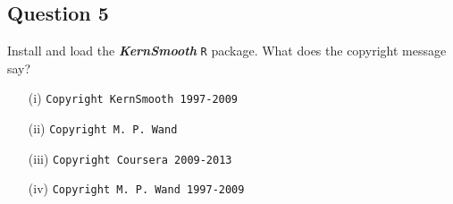 \documentclass[12pt]{article}
\begin{document}
\newpage

\subsection*{Question 5}
Install and load the \textbf{\emph{KernSmooth}} \texttt{R} package. What does the copyright message say?

\begin{itemize}
\item[(i)] \texttt{Copyright KernSmooth 1997-2009}
\item[(ii)] \texttt{Copyright M. P. Wand}
\item[(iii)] \texttt{Copyright Coursera 2009-2013}
\item[(iv)] \texttt{Copyright M. P. Wand 1997-2009}
\end{itemize}
\end{document}
